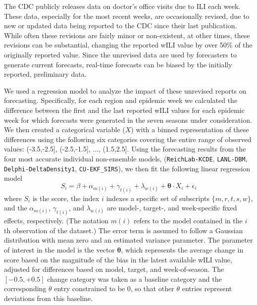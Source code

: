 \documentclass[9pt,twocolumn,twoside]{pnas-new}\usepackage[]{graphicx}\usepackage[]{color}
\begin{document}
{The CDC publicly releases data on doctor's office visits due to ILI each week. 
These data, especially for the most recent weeks, are occasionally revised, due to new or updated data being reported to the CDC since their last publication.
While often these revisions are fairly minor or non-existent, at other times, these revisions can be substantial, changing the reported wILI value by over 50\% of the originally reported value.
Since the unrevised data are used by forecasters to generate current forecasts, real-time forecasts can be biased by the initially reported, preliminary data.

We used a regression model to analyze the impact of these unrevised reports on forecasting.
Specifically, for each region and epidemic week we calculated the difference between the first and the last reported wILI values for each epidemic week for which forecasts were generated in the seven seasons under consideration.
We then created a categorical variable ($X$) with a binned representation of these differences using the following six categories covering the entire range of observed values: (-3.5,-2.5], (-2.5,-1.5], ..., (1.5,2.5].
Using the forecasting results from the four most accurate individual non-ensemble models, ({\tt ReichLab-KCDE}, {\tt LANL-DBM}, {\tt Delphi-DeltaDensity1}, {\tt CU-EKF\_SIRS}), we then fit the following linear regression model
\begin{equation}
S_i = \beta + \alpha_{m(i)} + \gamma_{t(i)} + \lambda_{w(i)} + {\mathbf \theta}\cdot X_i + \epsilon_i
\end{equation}
where $S_i$ is the score, the index $i$ indexes a specific set of subscripts $\{m,r,t,s,w\}$, and the $\alpha_{m(i)}$, $\gamma_{t(i)}$, and $\lambda_{w(i)}$ are model-, target-, and week-specific fixed effects, respectively. (The notation $m(i)$ refers to the model contained in the $i$th observation of the dataset.) The error term is assumed to follow a Gaussian distribution with mean zero and an estimated variance parameter. 
The parameter of interest in the model is the vector ${\mathbf \theta}$, which represents the average change in score based on the magnitude of the bias in the latest available wILI value, adjusted for differences based on model, target, and week-of-season.  The $[-0.5,+0.5]$ change category was taken as a baseline category and the corresponding $\theta$ entry constrained to be 0, so that other $\theta$ entries represent deviations from this baseline.

}
\end{document}
